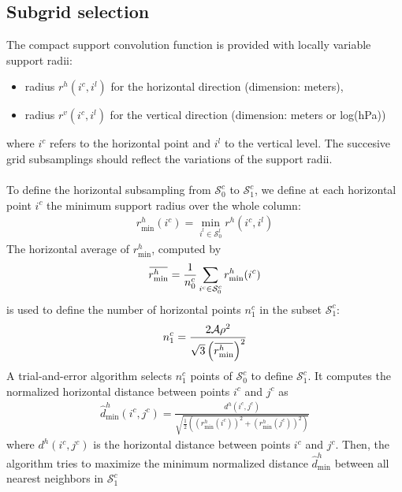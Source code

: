 \documentclass[12pt]{scrartcl}
\newcommand{\overbar}[1]{\mkern 1.5mu\overline{\mkern-1.5mu#1\mkern-1.5mu}\mkern 1.5mu}
\begin{document}
\subsection{Subgrid selection}
The compact support convolution function is provided with locally variable support radii:
\begin{itemize}
\item radius $r^h(i^c,i^l)$ for the horizontal direction (dimension: meters),
\item radius $r^v(i^c,i^l)$ for the vertical direction (dimension: meters or log(hPa))
\end{itemize}
where $i^c$ refers to the horizontal point and $i^l$ to the vertical level. The succesive grid subsamplings should reflect the variations of the support radii.\\
$  $\\
To define the horizontal subsampling from $\mathcal{S}^c_0$ to $\mathcal{S}^c_1$, we define at each horizontal point $i^c$ the minimum support radius over the whole column:
\begin{align}
r^h_\mathrm{min}(i^c) = \min_{i^l \in \mathcal{S}^l_0} r^h(i^c,i^l)
\end{align}
The horizontal average of $r^h_\mathrm{min}$, computed by
\begin{align}
\overbar{r^h_\mathrm{min}} = \frac{1}{n^c_0} \sum_{i^c \in \mathcal{S}^c_0} r^h_\mathrm{min}(i^c)
\end{align}
is used to define the number of horizontal points $n^c_1$ in the subset $\mathcal{S}^c_1$:
\begin{align}
n^c_1 = \frac{2 \mathcal{A} \rho^2}{\sqrt{3} \left(\overbar{r^h_\mathrm{min}}\right)^2}
\end{align}
A trial-and-error algorithm selects $n^c_1$ points of $\mathcal{S}^c_0$ to define $\mathcal{S}^c_1$. It computes the normalized horizontal distance between points $i^c$ and $j^c$ as
\begin{align}
\widehat{d}^h_\text{min}(i^c,j^c) = \frac{d^h(i^c,j^c)}{\displaystyle \sqrt{\frac{1}{2}\left(\left(r^h_\mathrm{min}(i^c)\right)^2+\left(r^h_\mathrm{min}(j^c)\right)^2\right)}}
\end{align}
where $d^h(i^c,j^c)$ is the horizontal distance between points $i^c$ and $j^c$. Then, the algorithm tries to maximize the minimum normalized distance $\widehat{d}^h_\text{min}$ between all nearest neighbors in $\mathcal{S}^c_1$
\end{document}
